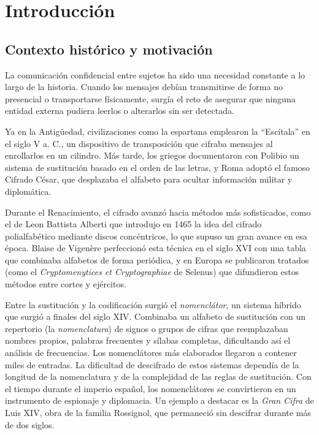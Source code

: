 \chapter{Introducción}

\section{Contexto histórico y motivación}
La comunicación confidencial entre sujetos ha sido una necesidad constante a lo largo de la historia. Cuando los mensajes debían transmitirse de forma no presencial o transportarse físicamente, surgía el reto de asegurar que ninguna entidad externa pudiera leerlos o alterarlos sin ser detectada.

Ya en la Antigüedad, civilizaciones como la espartana emplearon la “Escítala” en el siglo V a. C., un dispositivo de transposición que cifraba mensajes al enrollarlos en un cilindro. Más tarde, los griegos documentaron con Polibio un sistema de sustitución basado en el orden de las letras, y Roma adoptó el famoso Cifrado César, que desplazaba el alfabeto para ocultar información militar y diplomática.

Durante el Renacimiento, el cifrado avanzó hacia métodos más sofisticados, como el de Leon Battista Alberti que introdujo en 1465 la idea del cifrado polialfabético mediante discos concéntricos, lo que supuso un gran avance en esa época. Blaise de Vigenère perfeccionó esta técnica en el siglo XVI con una tabla que combinaba alfabetos de forma periódica, y en Europa se publicaron tratados (como el \emph{Cryptomenytices et Cryptographiae} de Selenus) que difundieron estos métodos entre cortes y ejércitos.

Entre la sustitución y la codificación surgió el \emph{nomenclátor}, un sistema híbrido 
que surgió a finales del siglo XIV. 
Combinaba un alfabeto de sustitución con un repertorio (la \emph{nomenclatura}) de 
signos o grupos de cifras que reemplazaban nombres propios, palabras frecuentes y 
sílabas completas, dificultando así el análisis de frecuencias. Los nomenclátores más 
elaborados llegaron a contener miles de entradas. La dificultad de descifrado de estos sistemas dependía de la longitud de la nomenclatura y de la complejidad de las reglas de sustitución.
Con el tiempo durante el imperio español, los nomenclátores se convirtieron en un instrumento de espionaje y diplomacia.
Un ejemplo a destacar es la \emph{Gran Cifra} 
de Luis XIV, obra de la familia Rossignol, que permaneció sin descifrar durante más de dos siglos.

